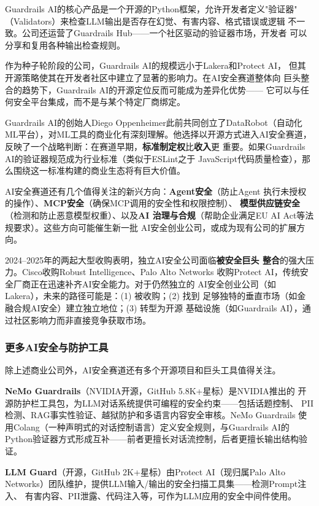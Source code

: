 Guardrails AI的核心产品是一个开源的Python框架，允许开发者定义"验证器"
（Validators）来检查LLM输出是否存在幻觉、有害内容、格式错误或逻辑
不一致。公司还运营了Guardrails Hub——一个社区驱动的验证器市场，开发者
可以分享和复用各种输出检查规则。

作为种子轮阶段的公司，Guardrails AI的规模远小于Lakera和Protect AI，
但其开源策略使其在开发者社区中建立了显著的影响力。在AI安全赛道整体向
巨头整合的趋势下，Guardrails AI的开源定位反而可能成为差异化优势——
它可以与任何安全平台集成，而不是与某个特定厂商绑定。

Guardrails AI的创始人Diego Oppenheimer此前共同创立了DataRobot（自动化
ML平台），对ML工具的商业化有深刻理解。他选择以开源方式进入AI安全赛道，
反映了一个战略判断：在赛道早期，\textbf{标准制定权}比\textbf{收入}更
重要。如果Guardrails AI的验证器规范成为行业标准（类似于ESLint之于
JavaScript代码质量检查），那么围绕这一标准构建的商业生态将有巨大价值。

AI安全赛道还有几个值得关注的新兴方向：\textbf{Agent安全}（防止Agent
执行未授权的操作）、\textbf{MCP安全}（确保MCP调用的安全性和权限控制）、
\textbf{模型供应链安全}（检测和防止恶意模型权重）、以及\textbf{AI
治理与合规}（帮助企业满足EU AI Act等法规要求）。这些方向可能催生新一批
AI安全创业公司，或成为现有公司的扩展方向。

\begin{warnbox}[AI安全赛道的整合信号]
2024--2025年的两起大型收购表明，独立AI安全公司面临\textbf{被安全巨头
整合}的强大压力。Cisco收购Robust Intelligence、Palo Alto Networks
收购Protect AI，传统安全厂商正在迅速补齐AI安全能力。对于仍然独立的
AI安全创业公司（如Lakera），未来的路径可能是：(1) 被收购；(2) 找到
足够独特的垂直市场（如金融合规AI安全）建立独立地位；(3) 转型为开源
基础设施（如Guardrails AI），通过社区影响力而非直接竞争获取市场。
\end{warnbox}

\subsubsection{更多AI安全与防护工具}
除上述商业公司外，AI安全赛道还有多个开源项目和巨头工具值得关注。

\textbf{NeMo Guardrails}（NVIDIA开源，GitHub 5.8K+星标）是NVIDIA推出的
开源防护栏工具包，为LLM对话系统提供可编程的安全约束——包括话题控制、
PII检测、RAG事实性验证、越狱防护和多语言内容安全审核。NeMo Guardrails
使用Colang（一种声明式的对话控制语言）定义安全规则，与Guardrails AI的
Python验证器方式形成互补——前者更擅长对话流控制，后者更擅长输出结构验证。

\textbf{LLM Guard}（开源，GitHub 2K+星标）由Protect AI（现归属Palo Alto
Networks）团队维护，提供LLM输入/输出的安全扫描工具集——检测Prompt注入、
有害内容、PII泄露、代码注入等，可作为LLM应用的安全中间件使用。

